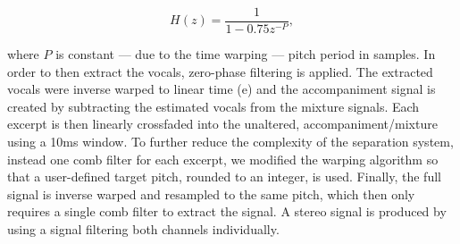 \begin{equation}
  H(z) = \frac{1}{1 - 0.75z^{-P}},
\end{equation}

where \(P\) is constant --- due to the time warping --- pitch period in samples.
In order to then extract the vocals, zero-phase filtering is applied.
The extracted vocals were inverse warped to linear time (e) and the accompaniment signal is created by subtracting the estimated vocals from the mixture signals.
Each excerpt is then linearly crossfaded into the unaltered, accompaniment/mixture using a 10ms window.
To further reduce the complexity of the separation system, instead one comb filter for each excerpt, we modified the warping algorithm so that a user-defined target pitch, rounded to an integer, is used.
Finally, the full signal is inverse warped and resampled to the same pitch, which then only requires a single comb filter to extract the signal.
A stereo signal is produced by using a signal filtering both channels individually.

